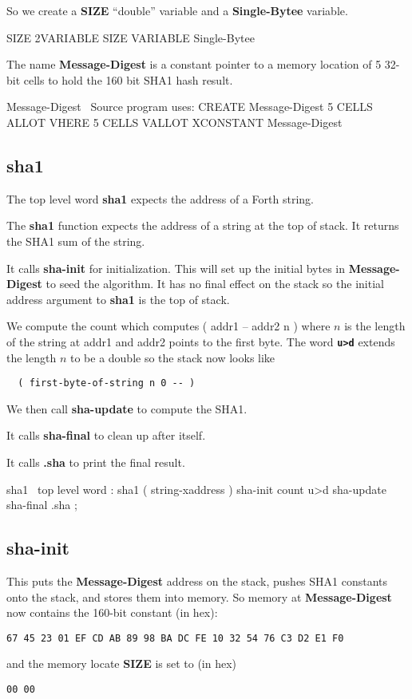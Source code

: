 So we create a {\bf SIZE} ``double'' variable and a {\bf Single-Bytee} 
variable.
\begin{chunk}{SIZE}
2VARIABLE SIZE
VARIABLE Single-Bytee

\end{chunk}

The name {\bf Message-Digest} is a constant pointer to a memory location
of 5 32-bit cells to hold the 160 bit SHA1 hash result.
\begin{chunk}{Message-Digest}
\ Source program uses: CREATE Message-Digest   5 CELLS ALLOT
VHERE 5 CELLS VALLOT
XCONSTANT Message-Digest

\end{chunk}

\subsection{sha1}
The top level word {\bf sha1} expects the address of a Forth string.

The {\bf sha1} function expects the address of a string at the top of stack.
It returns the SHA1 sum of the string.

It calls {\bf sha-init} for initialization. This will set up the initial
bytes in {\bf Message-Digest} to seed the algorithm. It has no final 
effect on the stack so the initial address argument to {\bf sha1} is
the top of stack.

We compute the count which computes ( addr1 -- addr2 n ) where $n$ is the
length of the string at addr1 and addr2 points to the first byte. The
word {\bf \verb|u>d|} extends the length $n$ to be a double so the 
stack now looks like 
\begin{verbatim}
  ( first-byte-of-string n 0 -- )
\end{verbatim}
We then call {\bf sha-update} to compute the SHA1.

It calls {\bf sha-final} to clean up after itself.

It calls {\bf .sha} to print the final result.

\begin{chunk}{sha1}
\ top level word
: sha1 ( string-xaddress )
  sha-init
  count u>d sha-update
  sha-final
.sha ;

\end{chunk}

\subsection{sha-init}
This puts the {\bf Message-Digest} address on the stack, pushes
SHA1 constants onto the stack, and stores them into memory. So
memory at {\bf Message-Digest} now contains the 160-bit constant
(in hex):
\begin{verbatim}
67 45 23 01 EF CD AB 89 98 BA DC FE 10 32 54 76 C3 D2 E1 F0
\end{verbatim}
and the memory locate {\bf SIZE} is set to (in hex)
\begin{verbatim}
00 00
\end{verbatim}

